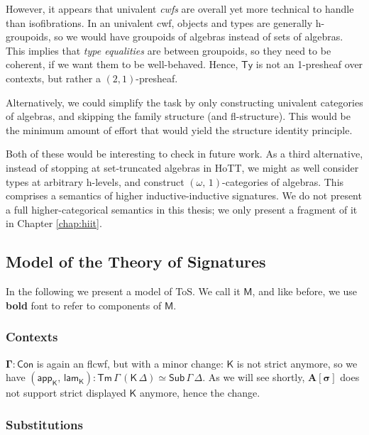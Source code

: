 \documentclass[12pt,a4paper,twoside,openany]{book}
\theoremstyle{remark}
\theoremstyle{definition}
\theoremstyle{theorem}
\newcommand{\bs}[1]{\boldsymbol{#1}}
\newcommand{\Con}{\mathsf{Con}}
\newcommand{\Sub}{\mathsf{Sub}}
\newcommand{\Tm}{\mathsf{Tm}}
\newcommand{\Ty}{\mathsf{Ty}}
\newcommand{\lamK}{\mathsf{lam}_{\K}}
\newcommand{\appK}{\mathsf{app}_{\K}}
\newcommand{\K}{\mathsf{K}}
\newcommand{\bCon}{\bs{\Con}}
\newcommand{\bGamma}{\bs{\Gamma}}
\newcommand{\bM}{\bs{\mathsf{M}}}
\begin{document}
However, it appears that univalent \emph{cwfs} are overall yet more technical to
handle than isofibrations. In an univalent cwf, objects and types are generally
h-groupoids, so we would have groupoids of algebras instead of sets of
algebras. This implies that \emph{type equalities} are between groupoids, so
they need to be coherent, if we want them to be well-behaved. Hence, $\Ty$ is
not an 1-presheaf over contexts, but rather a $(2,1)$-presheaf.

Alternatively, we could simplify the task by only constructing univalent
categories of algebras, and skipping the family structure (and
fl-structure). This would be the minimum amount of effort that would yield the
structure identity principle.

Both of these would be interesting to check in future work. As a third
alternative, instead of stopping at set-truncated algebras in HoTT, we might as
well consider types at arbitrary h-levels, and construct
$(\omega,\,1)$-categories of algebras. This comprises a semantics of higher
inductive-inductive signatures. We do not present a full higher-categorical
semantics in this thesis; we only present a fragment of it in Chapter
\ref{chap:hiit}.

\subsection{Model of the Theory of Signatures}

In the following we present a model of ToS. We call it $\bM$, and like before,
we use \textbf{bold} font to refer to components of $\bM$.

\subsubsection{Contexts}

$\bGamma : \bCon$ is again an flcwf, but with a minor change: $\K$ is not strict
anymore, so we have $(\appK,\,\lamK) : \Tm\,\Gamma\,(\K\,\Delta) \simeq
\Sub\,\Gamma\,\Delta$. As we will see shortly, $\bs{A[\sigma]}$ does not
support strict displayed $\K$ anymore, hence the change.

\subsubsection{Substitutions}
\label{sec:iqiit-substitutions}
\end{document}
